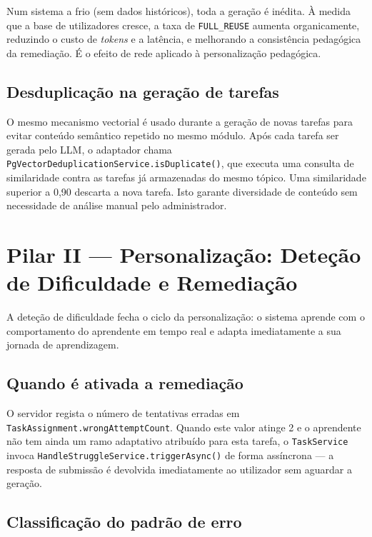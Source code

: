 Num sistema a frio (sem dados históricos), toda a geração é inédita.
À medida que a base de utilizadores cresce, a taxa de
\texttt{FULL\_REUSE} aumenta organicamente, reduzindo o custo de
\textit{tokens} e a latência, e melhorando a consistência pedagógica
da remediação.
É o efeito de rede aplicado à personalização pedagógica.

\subsection*{Desduplicação na geração de tarefas}

O mesmo mecanismo vectorial é usado durante a geração de novas tarefas
para evitar conteúdo semântico repetido no mesmo módulo.
Após cada tarefa ser gerada pelo LLM, o adaptador chama
\texttt{PgVectorDeduplicationService.isDuplicate()}, que executa uma
consulta de similaridade contra as tarefas já armazenadas do mesmo tópico.
Uma similaridade superior a 0{,}90 descarta a nova tarefa.
Isto garante diversidade de conteúdo sem necessidade de análise manual
pelo administrador.

\section{Pilar II — Personalização: Deteção de Dificuldade e Remediação}
\label{sec:pilar_remediacao}

A deteção de dificuldade fecha o ciclo da personalização: o sistema
aprende com o comportamento do aprendente em tempo real e adapta
imediatamente a sua jornada de aprendizagem.

\subsection*{Quando é ativada a remediação}

O servidor regista o número de tentativas erradas em
\texttt{TaskAssignment.wrongAttemptCount}.
Quando este valor atinge 2 e o aprendente não tem ainda um ramo
adaptativo atribuído para esta tarefa, o
\texttt{TaskService} invoca
\texttt{HandleStruggleService.triggerAsync()} de forma assíncrona —
a resposta de submissão é devolvida imediatamente ao utilizador sem
aguardar a geração.

\subsection*{Classificação do padrão de erro}

